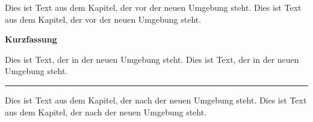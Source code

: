 \documentclass[12pt,a4paper]{scrbook}
\newenvironment{Zusammenfassung}[2][lightgray]{%
	\def\Farbe{#1}%
	\vspace{0.5cm}%
	\par\noindent%
	\colorbox{\Farbe}{%
		\parbox[l][0.5cm][c]{\textwidth}{%
			\textbf{#2}}}%
	\vspace{0.5cm}%
}%
{{\newline\color{\Farbe}\rule{\textwidth}{1pt}}\vskip15pt}
\begin{document}
Dies ist Text aus dem Kapitel, der vor der neuen Umgebung steht. 
Dies ist Text aus dem Kapitel, der vor der neuen Umgebung steht.
\begin{Zusammenfassung}[meinHellesGrau]{Kurzfassung}
	Dies ist Text, der in der neuen Umgebung steht. 
	Dies ist Text, der in der neuen Umgebung steht. 
\end{Zusammenfassung}
Dies ist Text aus dem Kapitel, der nach der neuen Umgebung steht. 
Dies ist Text aus dem Kapitel, der nach der neuen Umgebung steht. 
\end{document}
